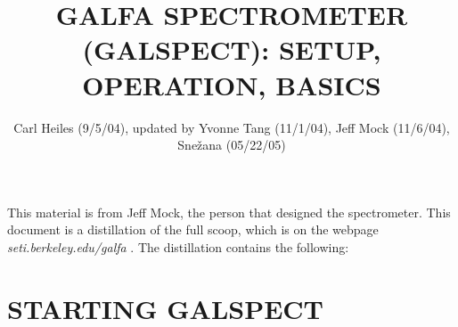 \documentclass[psfig,preprint]{aastex}
\begin{document}
                                                                                

\title{GALFA SPECTROMETER (GALSPECT): SETUP, OPERATION, BASICS}

\author{Carl Heiles (9/5/04), updated by Yvonne Tang (11/1/04), Jeff
Mock (11/6/04), Sne\v{z}ana (05/22/05)}
                                                                                

	This material is from Jeff Mock, the person that designed the 
spectrometer.  This document is a distillation of the full scoop, 
which is on the webpage {\it seti.berkeley.edu/galfa} . The distillation 
contains the following: 

\tableofcontents


\section{ STARTING GALSPECT} \label{start}
\end{document}
